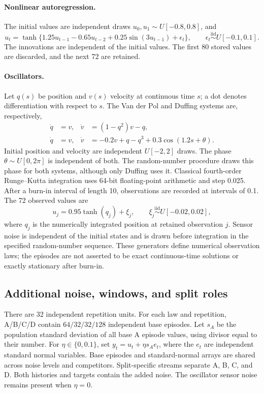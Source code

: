 \paragraph{Nonlinear autoregression.}
The initial values are independent draws $u_0,u_1\sim U[-0.8,0.8]$, and
\[
 u_t=\tanh\{1.25u_{t-1}-0.65u_{t-2}+0.25\sin(3u_{t-1})+\epsilon_t\},
 \qquad \epsilon_t\stackrel{\mathrm{iid}}\sim U[-0.1,0.1].
\]
The innovations are independent of the initial values. The first 80 stored values are discarded, and the next 72 are retained.

\paragraph{Oscillators.}
Let $q(s)$ be position and $v(s)$ velocity at continuous time $s$; a dot denotes differentiation with respect to $s$. The Van der Pol and Duffing systems are, respectively,
\begin{align*}
 \dot q&=v,& \dot v&=(1-q^2)v-q,\\
 \dot q&=v,& \dot v&=-0.2v+q-q^3+0.3\cos(1.2s+\theta).
\end{align*}
Initial position and velocity are independent $U[-2,2]$ draws. The phase $\theta\sim U[0,2\pi]$ is independent of both. The random-number procedure draws this phase for both systems, although only Duffing uses it. Classical fourth-order Runge--Kutta integration uses 64-bit floating-point arithmetic and step 0.025. After a burn-in interval of length 10, observations are recorded at intervals of 0.1. The 72 observed values are
\[
 u_j=0.95\tanh(q_j)+\xi_j,\qquad
 \xi_j\stackrel{\mathrm{iid}}\sim U[-0.02,0.02],
\]
where $q_j$ is the numerically integrated position at retained observation $j$. Sensor noise is independent of the initial states and is drawn before integration in the specified random-number sequence. These generators define numerical observation laws; the episodes are not asserted to be exact continuous-time solutions or exactly stationary after burn-in.

\subsection{Additional noise, windows, and split roles}
There are 32 independent repetition units. For each law and repetition, A/B/C/D contain $64/32/32/128$ independent base episodes. Let $s_A$ be the population standard deviation of all base A episode values, using divisor equal to their number. For $\eta\in\{0,0.1\}$, set $y_t=u_t+\eta s_A e_t$, where the $e_t$ are independent standard normal variables. Base episodes and standard-normal arrays are shared across noise levels and competitors. Split-specific streams separate A, B, C, and D. Both histories and targets contain the added noise. The oscillator sensor noise remains present when $\eta=0$.

